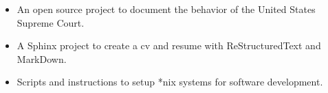 \documentclass[letterpaper,10pt,english]{sphinxmanual}
\begin{document}
\begin{description}
\begin{itemize}
\end{itemize}

\item[{\sphinxhref{https://court-behavior.io}{Court\sphinxhyphen{}Behavior.io:}\sphinxfootnotemark[11]}] \leavevmode%
\begin{footnotetext}[11]\label{\thesphinxscope.11}%
\sphinxAtStartFootnote
{}
%
\end{footnotetext}\ignorespaces \begin{itemize}
\item {} 
\sphinxAtStartPar
An open source project to document the behavior of the United States Supreme Court.

\end{itemize}

\item[{\sphinxhref{https://docs.jnapolitano.io/parts/reference/build-this-site/index.html}{Sphinx CV Template:}\sphinxfootnotemark[12]}] \leavevmode%
\begin{footnotetext}[12]\label{\thesphinxscope.12}%
\sphinxAtStartFootnote
{}
%
\end{footnotetext}\ignorespaces \begin{itemize}
\item {} 
\sphinxAtStartPar
A Sphinx project to create a cv and resume with ReStructuredText and MarkDown.

\end{itemize}

\item[{\sphinxhref{https://docs.jnapolitano.io/parts/reference/configuration/index.html}{Development Setup Scripts:}\sphinxfootnotemark[13]}] \leavevmode%
\begin{footnotetext}[13]\label{\thesphinxscope.13}%
\sphinxAtStartFootnote
{}
%
\end{footnotetext}\ignorespaces \begin{itemize}
\item {} 
\sphinxAtStartPar
Scripts and instructions to setup *nix systems for software development.

\end{itemize}

\end{description}

\begin{DUlineblock}{0em}
\item[] 
\end{DUlineblock}
\end{document}
